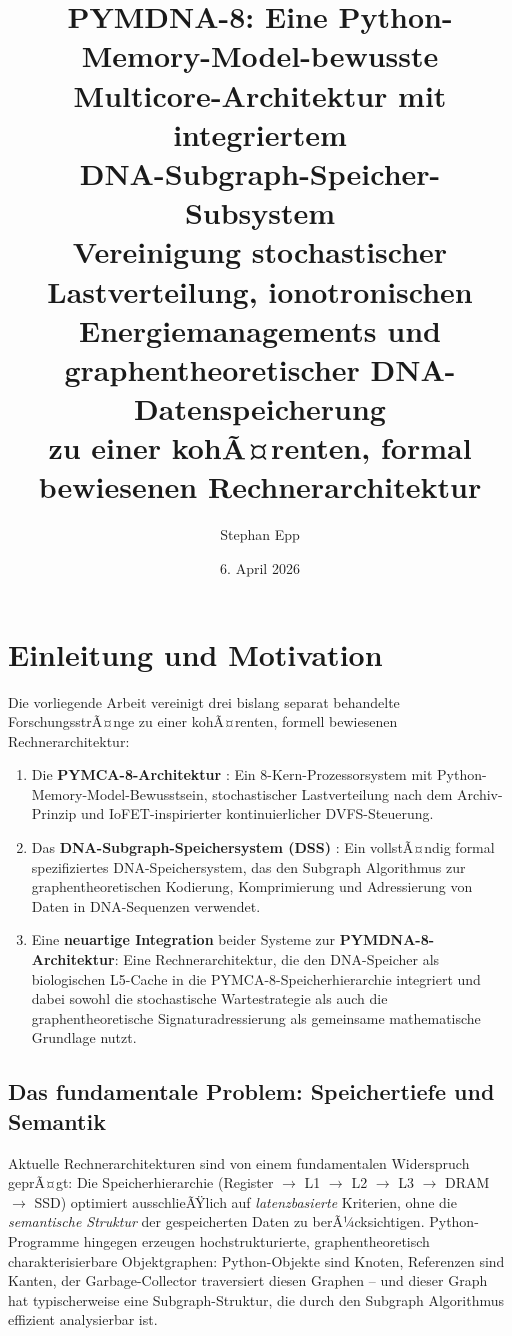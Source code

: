 ﻿\documentclass[a4paper,12pt]{article}
\title{\textbf{PYMDNA-8: Eine Python-Memory-Model-bewusste\\
    Multicore-Architektur mit integriertem\\
    DNA-Subgraph-Speicher-Subsystem}\\[0.5em]
  \large Vereinigung stochastischer Lastverteilung, ionotronischen\\
  Energiemanagements und graphentheoretischer DNA-Datenspeicherung\\
  zu einer kohÃ¤renten, formal bewiesenen Rechnerarchitektur}
\author{Stephan Epp}
\date{6. April 2026}
\theoremstyle{definition}
\begin{document}

\maketitle
\tableofcontents
\newpage

\section{Einleitung und Motivation}

Die vorliegende Arbeit vereinigt drei bislang separat behandelte ForschungsstrÃ¤nge
zu einer kohÃ¤renten, formell bewiesenen Rechnerarchitektur:

\begin{enumerate}[noitemsep]
  \item Die \textbf{PYMCA-8-Architektur} \cite{epp2026pymca8}: Ein
    8-Kern-Prozessorsystem mit Python-Memory-Model-Bewusstsein, stochastischer
    Lastverteilung nach dem Archiv-Prinzip und IoFET-inspirierter kontinuierlicher
    DVFS-Steuerung.
  \item Das \textbf{DNA-Subgraph-Speichersystem (DSS)} \cite{epp2026dnastor}:
    Ein vollstÃ¤ndig formal spezifiziertes DNA-Speichersystem, das den Subgraph
    Algorithmus \cite{epp2026subgraph} zur graphentheoretischen Kodierung,
    Komprimierung und Adressierung von Daten in DNA-Sequenzen verwendet.
  \item Eine \textbf{neuartige Integration} beider Systeme zur
    \textbf{PYMDNA-8-Architektur}: Eine Rechnerarchitektur, die den
    DNA-Speicher als biologischen L5-Cache in die PYMCA-8-Speicherhierarchie
    integriert und dabei sowohl die stochastische Wartestrategie als auch
    die graphentheoretische Signaturadressierung als gemeinsame mathematische
    Grundlage nutzt.
\end{enumerate}

\subsection{Das fundamentale Problem: Speichertiefe und Semantik}

Aktuelle Rechnerarchitekturen sind von einem fundamentalen Widerspruch geprÃ¤gt:
Die Speicherhierarchie (Register $\to$ L1 $\to$ L2 $\to$ L3 $\to$ DRAM $\to$ SSD)
optimiert ausschlieÃŸlich auf \emph{latenzbasierte} Kriterien, ohne die
\emph{semantische Struktur} der gespeicherten Daten zu berÃ¼cksichtigen.
Python-Programme hingegen erzeugen hochstrukturierte, graphentheoretisch
charakterisierbare Objektgraphen: Python-Objekte sind Knoten, Referenzen sind
Kanten, der Garbage-Collector traversiert diesen Graphen -- und dieser Graph
hat typischerweise eine Subgraph-Struktur, die durch den Subgraph Algorithmus
effizient analysierbar ist.
\end{document}
